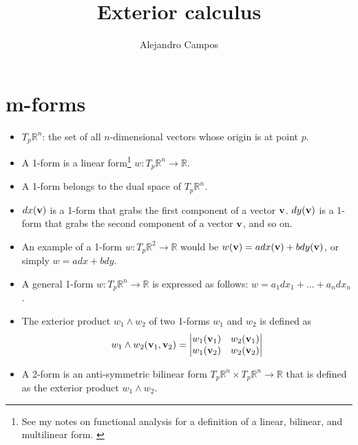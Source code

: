 \documentclass[11pt]{article}
\title{Exterior calculus}
\author{Alejandro Campos}
\begin{document}
\maketitle
\tableofcontents

\section{m-forms}
\begin{itemize}

    \item $T_p \mathbb{R}^n$: the set of all $n$-dimensional vectors whose origin is at point $p$.

    \item A 1-form is a linear form\footnote{See my notes on functional analysis for a definition of a linear, bilinear, and multilinear form. \label{fn:linear_forms}} $w:T_p \mathbb{R}^n \to \mathbb{R}$.

    \item A 1-form belongs to the dual space of $T_p \mathbb{R}^n$.

    \item $dx(\mathbf{v})$ is a 1-form that grabs the first component of a vector $\mathbf{v}$. $dy(\mathbf{v})$ is a 1-form that grabs the second component of a vector $\mathbf{v}$, and so on.

    \item An example of a 1-form $w:T_p \mathbb{R}^2 \to \mathbb{R}$ would be $w(\mathbf{v}) = a dx(\mathbf{v}) + b dy(\mathbf{v})$, or simply $w = a dx + b dy$.

    \item A general 1-form $w:T_p \mathbb{R}^n \to \mathbb{R}$ is expressed as follows: $w = a_1 dx_1 + ... + a_n dx_n$.

    \item The exterior product $w_1 \wedge w_2$ of two 1-forms $w_1$ and $w_2$ is defined as
    \begin{equation}
        w_1 \wedge w_2(\mathbf{v}_1, \mathbf{v}_2) =  
        \begin{vmatrix}
            w_1(\mathbf{v}_1) & w_2(\mathbf{v}_1) \\
            w_1(\mathbf{v}_2) & w_2(\mathbf{v}_2)
        \end{vmatrix}
    \end{equation}

    \item A 2-form is an anti-symmetric bilinear form $T_p \mathbb{R}^n \times T_p \mathbb{R}^n \to \mathbb{R}$ that is defined as the exterior product $w_1 \wedge w_2$.


\end{itemize}
\end{document}
